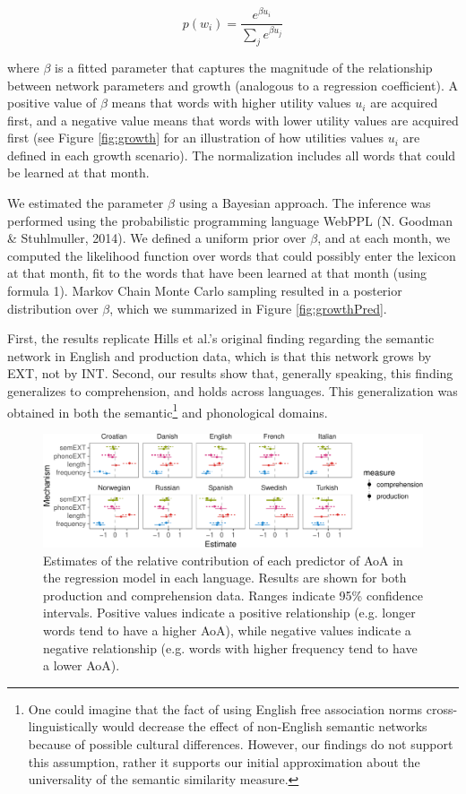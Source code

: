 \documentclass[english,floatsintext,man]{apa6}
\theoremstyle{definition}
\theoremstyle{definition}
\theoremstyle{definition}
\theoremstyle{remark}
\begin{document}
\begin{equation}
 p(w_i)= \frac{e^{\beta u_i}}{\sum_j e^{\beta u_j} }
\end{equation}

\noindent where \(\beta\) is a fitted parameter that captures the
magnitude of the relationship between network parameters and growth
(analogous to a regression coefficient). A positive value of \(\beta\)
means that words with higher utility values \(u_i\) are acquired first,
and a negative value means that words with lower utility values are
acquired first (see Figure \ref{fig:growth} for an illustration of how
utilities values \(u_i\) are defined in each growth scenario). The
normalization includes all words that could be learned at that month.

We estimated the parameter \(\beta\) using a Bayesian approach. The
inference was performed using the probabilistic programming language
WebPPL (N. Goodman \& Stuhlmuller, 2014). We defined a uniform prior
over \(\beta\), and at each month, we computed the likelihood function
over words that could possibly enter the lexicon at that month, fit to
the words that have been learned at that month (using formula 1). Markov
Chain Monte Carlo sampling resulted in a posterior distribution over
\(\beta\), which we summarized in Figure \ref{fig:growthPred}.

First, the results replicate Hills et al.'s original finding regarding
the semantic network in English and production data, which is that this
network grows by EXT, not by INT. Second, our results show that,
generally speaking, this finding generalizes to comprehension, and holds
across languages. This generalization was obtained in both the
semantic\footnote{One could imagine that the fact of using English free association norms cross-linguistically would decrease the effect of non-English semantic networks because of possible cultural differences. However, our findings do not support this assumption, rather it supports our initial approximation about the universality of the semantic similarity measure.}
and phonological domains.

\begin{figure}[!h]
\includegraphics[width=\textwidth]{ms_files/figure-latex/staticPred-1} \caption{Estimates of the relative contribution of each predictor of AoA in the regression model in each language. Results are shown for both production and comprehension data. Ranges indicate 95\% confidence intervals. Positive values indicate a positive relationship (e.g. longer words tend to have a higher AoA), while negative values indicate a negative relationship (e.g. words with higher frequency tend to have a lower AoA).}\label{fig:staticPred}
\end{figure}
\end{document}
